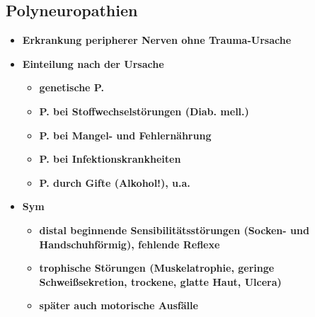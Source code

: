 \subsection{Polyneuropathien}
	\begin{itemize}
		\item \textbf{Erkrankung peripherer Nerven ohne Trauma-Ursache}
		\item \textbf{Einteilung nach der Ursache}
			\begin{itemize}
				\item \textbf{genetische P.}
				\item \textbf{P. bei Stoffwechselstörungen (Diab. mell.)}
				\item \textbf{P. bei Mangel- und Fehlernährung}
				\item \textbf{P. bei Infektionskrankheiten}
				\item \textbf{P. durch Gifte (Alkohol!), u.a.}
			\end{itemize}				
		\item \textbf{Sym}
			\begin{itemize}
				\item \textbf{distal beginnende Sensibilitätsstörungen (Socken- und Handschuhförmig), fehlende Reflexe}
				\item \textbf{trophische Störungen (Muskelatrophie, geringe Schweißsekretion, trockene, glatte Haut, Ulcera)}
				\item \textbf{später auch motorische Ausfälle}
			\end{itemize}
	\end{itemize}